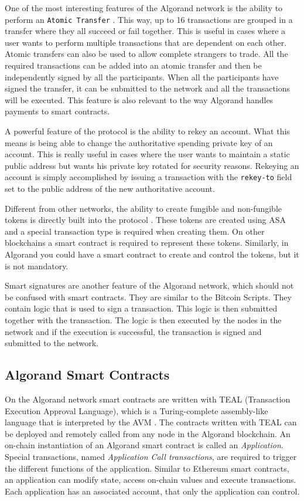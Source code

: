 One of the most interesting features of the Algorand network is the ability to perform an \texttt{Atomic Transfer} \cite{noauthor_atomic_nodate}. This way, up to 16 transactions are grouped in a transfer where they all succeed or fail together. This is useful in cases where a user wants to perform multiple transactions that are dependent on each other. Atomic transfers can also be used to allow complete strangers to trade. All the required transactions can be added into an atomic transfer and then be independently signed by all the participants. When all the participants have signed the transfer, it can be submitted to the network and all the transactions will be executed. This feature is also relevant to the way Algorand handles payments to smart contracts.

A powerful feature of the protocol is the ability to rekey an account. What this means is being able to change the authoritative spending private key of an account. This is really useful in cases where the user wants to maintain a static public address but wants his private key rotated for security reasons. Rekeying an account is simply accomplished by issuing a transaction with the \texttt{rekey-to} field set to the public address of the new authoritative account.

Different from other networks, the ability to create fungible and non-fungible tokens is directly built into the protocol \cite{noauthor_algorand_nodate-4}. These tokens are created using \ac{ASA} and a special transaction type is required when creating them. On other blockchains a smart contract is required to represent these tokens. Similarly, in Algorand you could have a smart contract to create and control the tokens, but it is not mandatory.

Smart signatures are another feature of the Algorand network, which should not be confused with smart contracts. They are similar to the Bitcoin Scripts. They contain logic that is used to sign a transaction. This logic is then submitted together with the transaction. The logic is then executed by the nodes in the network and if the execution is successful, the transaction is signed and submitted to the network.

\subsection*{Algorand Smart Contracts} \label{section:algorand-smartcontracts}
On the Algorand network smart contracts are written with TEAL (Transaction Execution Approval Language), which is a Turing-complete assembly-like language that is interpreted by the \ac{AVM} \cite{noauthor_introduction_nodate}. The contracts written with TEAL can be deployed and remotely called from any node in the Algorand blockchain. An on-chain instantiation of an Algorand smart contract is called an \textit{Application}. Special transactions, named \textit{Application Call transactions}, are required to trigger the different functions of the application. Similar to Ethereum smart contracts, an application can modify state, access on-chain values and execute transactions. Each application has an associated account, that only the application can control.

